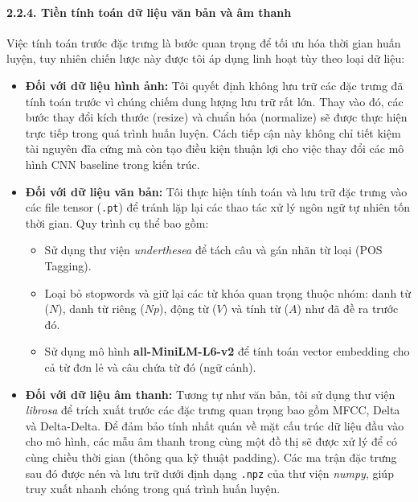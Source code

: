 \paragraph{2.2.4. Tiền tính toán dữ liệu văn bản và âm thanh}
\indent\indent Việc tính toán trước đặc trưng là bước quan trọng để tối ưu hóa thời gian huấn luyện, tuy nhiên chiến lược này được tôi áp dụng linh hoạt tùy theo loại dữ liệu:\vspace{-0.1cm}

\begin{itemize}[label={--}, itemsep=1pt]
    \item \textbf{Đối với dữ liệu hình ảnh:} Tôi quyết định không lưu trữ các đặc trưng đã tính toán trước vì chúng chiếm dung lượng lưu trữ rất lớn. Thay vào đó, các bước thay đổi kích thước (resize) và chuẩn hóa (normalize) sẽ được thực hiện trực tiếp trong quá trình huấn luyện. Cách tiếp cận này không chỉ tiết kiệm tài nguyên đĩa cứng mà còn tạo điều kiện thuận lợi cho việc thay đổi các mô hình CNN baseline trong kiến trúc.
    \item \textbf{Đối với dữ liệu văn bản:} Tôi thực hiện tính toán và lưu trữ đặc trưng vào các file tensor (\texttt{.pt}) để tránh lặp lại các thao tác xử lý ngôn ngữ tự nhiên tốn thời gian. Quy trình cụ thể bao gồm:\vspace{-0.1cm}
    \begin{itemize}[label={+}, itemsep=1pt]
        \item Sử dụng thư viện \textit{underthesea} để tách câu và gán nhãn từ loại (POS Tagging).
        \item Loại bỏ stopwords và giữ lại các từ khóa quan trọng thuộc nhóm: danh từ ($N$), danh từ riêng ($Np$), động từ ($V$) và tính từ ($A$) như đã đề ra trước đó.
        \item Sử dụng mô hình \textbf{all-MiniLM-L6-v2} để tính toán vector embedding cho cả từ đơn lẻ và câu chứa từ đó (ngữ cảnh).
    \end{itemize}
    \item \textbf{Đối với dữ liệu âm thanh:} Tương tự như văn bản, tôi sử dụng thư viện \textit{librosa} để trích xuất trước các đặc trưng quan trọng bao gồm MFCC, Delta và Delta-Delta. Để đảm bảo tính nhất quán về mặt cấu trúc dữ liệu đầu vào cho mô hình, các mẫu âm thanh trong cùng một đồ thị sẽ được xử lý để có cùng chiều thời gian (thông qua kỹ thuật padding). Các ma trận đặc trưng sau đó được nén và lưu trữ dưới định dạng \texttt{.npz} của thư viện \textit{numpy}, giúp truy xuất nhanh chóng trong quá trình huấn luyện.
\end{itemize}
